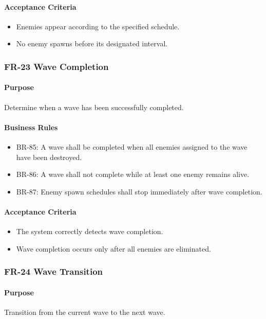 \documentclass[11pt,a4paper]{article}
\begin{document}
\paragraph{Acceptance Criteria}
\begin{itemize}
  \item Enemies appear according to the specified schedule.
  \item No enemy spawns before its designated interval.
\end{itemize}

\subsubsection{FR-23 Wave Completion}

\paragraph{Purpose}
Determine when a wave has been successfully completed.

\paragraph{Business Rules}
\begin{itemize}
  \item BR-85: A wave shall be completed when all enemies assigned to the wave
        have been destroyed.
  \item BR-86: A wave shall not complete while at least one enemy remains alive.
  \item BR-87: Enemy spawn schedules shall stop immediately after wave completion.
\end{itemize}

\paragraph{Acceptance Criteria}
\begin{itemize}
  \item The system correctly detects wave completion.
  \item Wave completion occurs only after all enemies are eliminated.
\end{itemize}

\subsubsection{FR-24 Wave Transition}

\paragraph{Purpose}
Transition from the current wave to the next wave.
\end{document}
